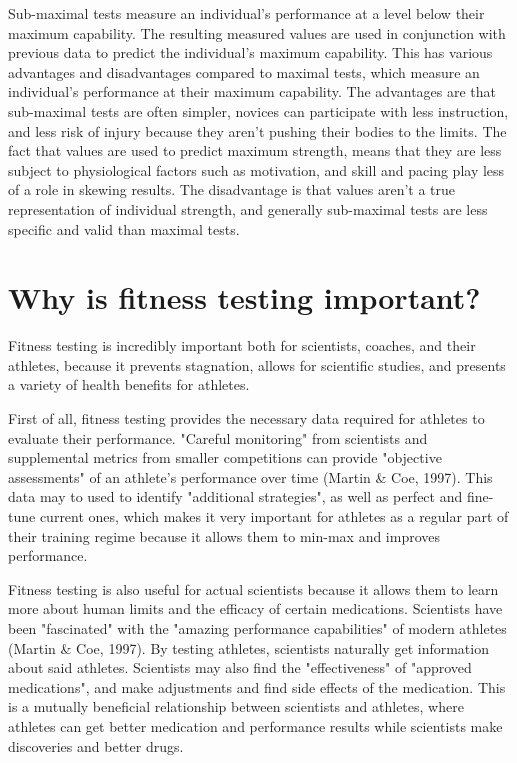\documentclass[12pt]{article}
\begin{document}
Sub-maximal tests measure an individual's performance at a level below their maximum capability. The resulting measured values are used in conjunction with previous data to predict the individual's maximum capability. This has various advantages and disadvantages compared to maximal tests, which measure an individual's performance at their maximum capability. The advantages are that sub-maximal tests are often simpler, novices can participate with less instruction, and less risk of injury because they aren't pushing their bodies to the limits. The fact that values are used to predict maximum strength, means that they are less subject to physiological factors such as motivation, and skill and pacing play less of a role in skewing results. The disadvantage is that values aren't a true representation of individual strength, and generally sub-maximal tests are less specific and valid than maximal tests.

\section*{Why is fitness testing important?}

Fitness testing is incredibly important both for scientists, coaches, and their athletes, because it prevents stagnation, allows for scientific studies, and presents a variety of health benefits for athletes.

First of all, fitness testing provides the necessary data required for athletes to evaluate their performance. "Careful monitoring" from scientists and supplemental metrics from smaller competitions can provide "objective assessments" of an athlete's performance over time (Martin \& Coe, 1997). This data may to used to identify "additional strategies", as well as perfect and fine-tune current ones, which makes it very important for athletes as a regular part of their training regime because it allows them to min-max and improves performance.

Fitness testing is also useful for actual scientists because it allows them to learn more about human limits and the efficacy of certain medications. Scientists have been "fascinated" with the "amazing performance capabilities" of modern athletes (Martin \& Coe, 1997). By testing athletes, scientists naturally get information about said athletes. Scientists may also find the "effectiveness" of "approved medications", and make adjustments and find side effects of the medication. This is a mutually beneficial relationship between scientists and athletes, where athletes can get better medication and performance results while scientists make discoveries and better drugs.
\end{document}
